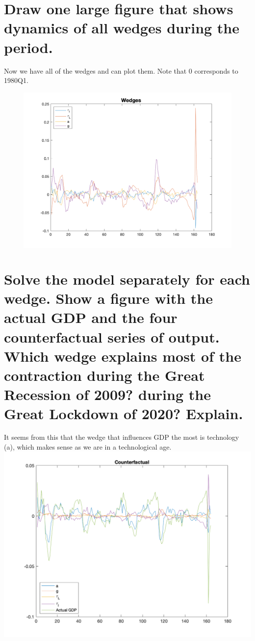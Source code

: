 \documentclass[12pt,oneside,reqno]{amsart}
\begin{document}
\section{Draw one large figure that shows dynamics of all wedges during the period.}
Now we have all of the wedges and can plot them. Note that 0 corresponds to 1980Q1. 
\begin{figure} [h]
\includegraphics[scale=.7]{wedges}
\end{figure}


\section{Solve the model separately for each wedge.  Show a figure with the actual GDP and the four counterfactual series of output.  Which wedge explains most of the contraction during the Great Recession of 2009?  during the Great Lockdown of 2020?  Explain.}

It seems from this that the wedge that influences GDP the most is technology (a), which makes sense as we are in a technological age. \\
\includegraphics[scale=.7]{counterfact}
\end{document}
